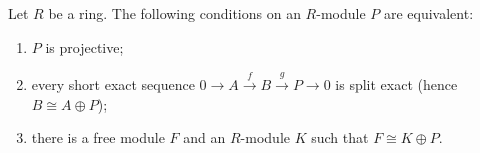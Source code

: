 Let $R$ be a ring. The following conditions on an $R$-module $P$ are equivalent:
\begin{enumerate}
\item[(i)] $P$ is projective;
\item[(ii)] every short exact sequence $0 \to A \xrightarrow{f} B \xrightarrow{g} P \to 0$ is split exact (hence $B \cong A \oplus P$);
\item[(iii)] there is a free module $F$ and an $R$-module $K$ such that $F \cong K \oplus P$.
\end{enumerate}
